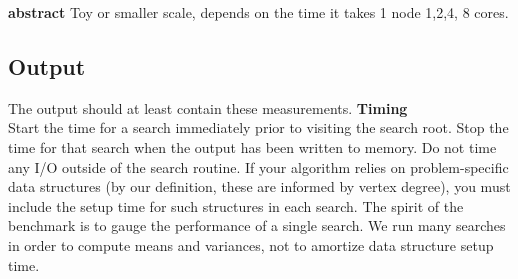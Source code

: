 \textbf{abstract}
Toy or smaller scale, depends on the time it takes 1 node 1,2,4, 8 cores.

\subsection{Output}
The output should at least contain these measurements.
\textbf{Timing} \\
Start the time for a search immediately prior to visiting the search root. Stop the time for that search when the output has been written to memory. Do not time any I/O outside of the search routine. If your algorithm relies on problem-specific data structures (by our definition, these are informed by vertex degree), you must include the setup time for such structures in each search. The spirit of the benchmark is to gauge the performance of a single search. We run many searches in order to compute means and variances, not to amortize data structure setup time.

